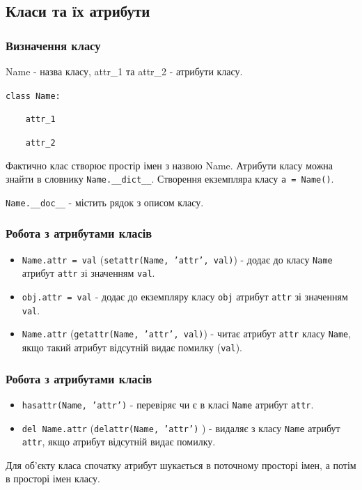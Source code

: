 \subsection{Класи та їх атрибути} 
\begin{frame}
\frametitle{Визначення класу}

Name - назва класу, attr\_1 та attr\_2 - атрибути класу. 

\texttt{class Name:}

\texttt{~~~~attr\_1}

\texttt{~~~~attr\_2}

 Фактично клас створює простір імен з назвою Name. Атрибути класу можна знайти в словнику \texttt{Name.\_\_dict\_\_}. Створення екземпляра класу \texttt{a = Name()}.
 
 \texttt{Name.\_\_doc\_\_} - містить рядок з описом класу.
\end{frame}

\begin{frame}
\frametitle{Робота з атрибутами класів}

\begin{itemize}
  \item <1-> \texttt{Name.attr = val} (\texttt{setattr(Name, 'attr', val)}) - додає до класу \texttt{Name} атрибут \texttt{attr} зі значенням \texttt{val}.
  \item <2-> \texttt{obj.attr = val} - додає до екземпляру класу \texttt{obj} атрибут \texttt{attr} зі значенням \texttt{val}.
  \item <3-> \texttt{Name.attr} (\texttt{getattr(Name, 'attr', val)}) - читає атрибут \texttt{attr} класу \texttt{Name}, якщо такий атрибут відсутній видає помилку (\texttt{val}).
  \end{itemize}

\end{frame}

\begin{frame}
\frametitle{Робота з атрибутами класів}

\begin{itemize}
  \item <1-> \texttt{hasattr(Name, 'attr')} - перевіряє чи є в класі \texttt{Name} атрибут \texttt{attr}.
  \item <2->\texttt{del Name.attr} (\texttt{delattr(Name, 'attr')} ) - видаляє з класу \texttt{Name} атрибут \texttt{attr}, якщо атрибут відсутній видає помилку.
 \end{itemize}
Для об'єкту класа спочатку атрибут шукається в поточному просторі імен, а потім в просторі імен класу.
\end{frame}

